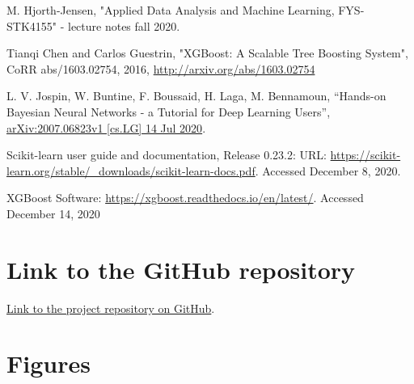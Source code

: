 \documentclass[numberedappendix, twocolappendix]{emulateapj}
\begin{document}
\begin{thebibliography}
M. Hjorth-Jensen, "Applied Data Analysis and Machine Learning, FYS-STK4155" - lecture notes fall 2020.

 Tianqi Chen and Carlos Guestrin, "XGBoost: A Scalable Tree Boosting System", CoRR abs/1603.02754, 2016, \url{http://arxiv.org/abs/1603.02754}

L. V. Jospin, W. Buntine, F. Boussaid, H. Laga, M. Bennamoun, “Hands-on Bayesian Neural Networks - a Tutorial for Deep Learning Users'', \url{arXiv:2007.06823v1 [cs.LG] 14 Jul 2020}.


Scikit-learn user guide and documentation, Release 0.23.2: URL: \url{https://scikit-learn.org/stable/_downloads/scikit-learn-docs.pdf}. Accessed December 8, 2020.

 XGBoost Software: \url{https://xgboost.readthedocs.io/en/latest/}. Accessed December 14, 2020




\end{thebibliography}



\newpage



\appendix

\section{Link to the GitHub repository}
\label{Appendix: github}
\href{https://github.com/tellefs/ML-projects/tree/master/project3}{Link to the project repository on GitHub}.


\section{Figures}\label{sec: appendix figures}
\end{document}
